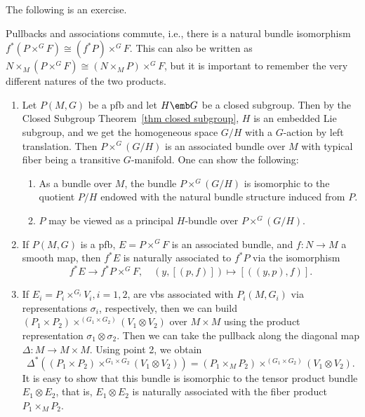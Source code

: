 The following is an exercise.
\begin{prop}\label{prop 1.2.8 RS2}
    Pullbacks and associations commute, i.e., there is a natural bundle isomorphism $f^\ast (P\times^G F)\cong (f^\ast P)\times^G F$. This can also be written as $N\times_M (P\times^G F)\cong (N\times_M P)\times^G F$, but it is important to remember the very different natures of the two products.
\end{prop}



\begin{example}\label{ex 1.2.4 RS2}
    \begin{enumerate}
        \item Let $P(M,G)$ be a \gls{pfb} and let $H\emb G$ be a closed subgroup. Then by the Closed Subgroup Theorem~\ref{thm closed subgroup}, $H$ is an embedded Lie subgroup, and we get the homogeneous space $G\slash H$ with a $G$-action by left translation. Then $P\times^G (G\slash H)$ is an associated bundle over $M$ with typical fiber being a transitive $G$-manifold. One can show the following:
        \begin{enumerate}
            \item As a bundle over $M$, the bundle $P\times^G (G\slash H)$ is isomorphic to the quotient $P\slash H$ endowed with the natural bundle structure induced from $P$.
            \item $P$ may be viewed as a principal $H$-bundle over $P\times^G (G\slash H)$.
        \end{enumerate}
        \item If $P(M,G)$ is a \gls{pfb}, $E=P\times^G F$ is an associated bundle, and $f:N\to M$ a smooth map, then $f^\ast E$ is naturally associated to $f^\ast P$ via the isomorphism
        \[f^\ast E\to f^\ast P\times^G F,\quad (y,[(p,f)])\mapsto [((y,p),f)].\label{eq 1.2.6 RS2}\]
        \item If $E_i=P_i\times^{G_i}V_i,i=1,2$, are \glspl{vb} associated with $P_i(M,G_i)$ via representations $\sigma_i$, respectively, then we can build $(P_1\times P_2)\times^{(G_1\times G_2)}(V_1\otimes V_2)$ over $M\times M$ using the product representation $\sigma_1\otimes \sigma_2$. Then we can take the pullback along the diagonal map $\Delta:M\to M\times M$. Using point 2, we obtain
        \[\Delta^\ast\left((P_1\times P_2)\times^{G_1\times G_2}(V_1\otimes V_2)\right)=(P_1\times_M P_2)\times^{(G_1\times G_2)}(V_1\otimes V_2).\]
        It is easy to show that this bundle is isomorphic to the tensor product bundle $E_1\otimes E_2$, that is, $E_1\otimes E_2$ is naturally associated with the fiber product $P_1\times_M P_2$.
    \end{enumerate}
\end{example}


